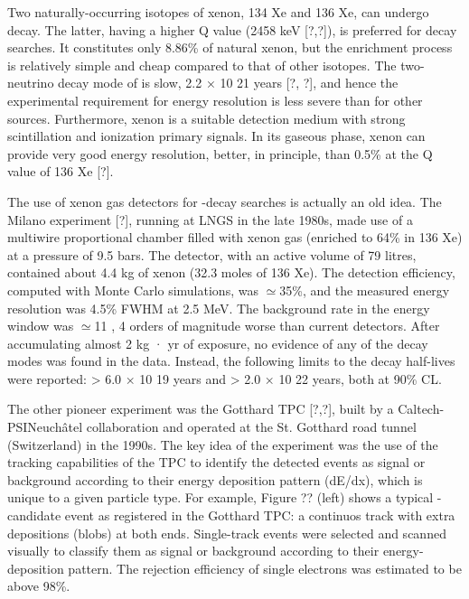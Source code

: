Two naturally-occurring isotopes of xenon, 134 Xe and 136 Xe, can undergo \bb decay. The latter, having a higher Q value (2458 keV [?,?]), is preferred for \bbonu decay searches. It constitutes only 8.86\% of natural xenon, but the enrichment process is relatively simple and cheap compared to that of other \bb isotopes. The two-neutrino decay mode of  is slow, 2.2 × 10 21 years [?, ?], and hence the experimental requirement for energy resolution is less severe than for other \bb sources. Furthermore, xenon is a suitable detection medium with strong scintillation and ionization primary signals. In its gaseous phase, xenon can provide very good energy resolution, better, in principle, than 0.5\% at the Q value of 136 Xe [?].

The use of xenon gas detectors for \bbonu-decay searches is actually an old idea. The Milano experiment [?], running at LNGS in the late 1980s, made use of a multiwire proportional chamber ﬁlled with xenon gas (enriched to 64\% in 136 Xe) at a pressure of 9.5 bars. The detector, with an active volume of 79 litres, contained about 4.4 kg of xenon (32.3 moles of 136 Xe). The detection eﬃciency, computed with Monte Carlo simulations, was $\simeq$35\%, and the measured energy resolution was 4.5\% FWHM at 2.5 MeV. The background rate in the \bbonu energy window was $\simeq$11 \ckkbby, 4 orders of magnitude worse than current detectors. After accumulating almost 2 kg · yr of exposure, no evidence of any of the \bb decay modes was found in the data. Instead, the following limits to the decay half-lives were reported: \Ttnu > 6.0 × 10 19 years and \Tonu > 2.0 × 10 22 years, both at 90\% CL.

The other pioneer experiment was the Gotthard TPC [?,?], built by a Caltech-PSINeuchâtel collaboration and operated at the St. Gotthard road tunnel (Switzerland) in the 1990s. The key idea of the experiment was the use of the tracking capabilities of the TPC to identify the detected events as signal or background according to their energy deposition pattern (dE/dx), which is unique to a given particle type. For example, Figure ?? (left) shows a typical \bb-candidate event as registered in the Gotthard TPC: a continuos track with extra depositions (blobs) at both ends. Single-track events were selected and scanned visually to classify them as signal or background according to their energy-deposition pattern. The rejection eﬃciency of single electrons was estimated to be above 98\%.

